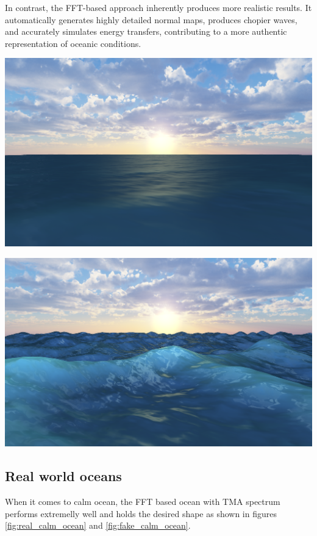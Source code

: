 In contrast, the FFT-based approach inherently produces more realistic results. It automatically generates highly detailed normal maps, produces chopier waves, and accurately simulates energy transfers, contributing to a more authentic representation of oceanic conditions.

\begin{minipage}{0.48\textwidth}
    \centering
    \includegraphics[width=1\textwidth]{"images/naive_calm.png"}
    \label{fig:naive_calm}
\end{minipage}
\hfill
\begin{minipage}{0.48\textwidth}
    \centering
    \includegraphics[width=1\textwidth]{"images/naive_storm.png"}
    \label{fig:naive_stormy}
\end{minipage}

\subsection{Real world oceans}
When it comes to calm ocean, the FFT based ocean with TMA spectrum performs extremelly well and holds the desired shape as shown in figures \ref{fig:real_calm_ocean} and \ref{fig:fake_calm_ocean}.

